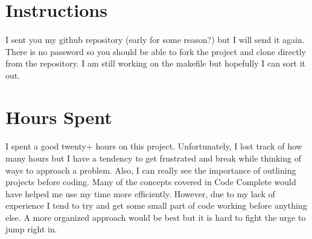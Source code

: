 \documentclass[11pt]{article}
\begin{document}
\section{Instructions}
\paragraph{} I sent you my github repository (early for some reason?) but I will send it again. There is no password so you should be able to fork the project and clone directly from the repository. I am still working on the makefile but hopefully I can sort it out.

\section{Hours Spent}
\paragraph{} I spent a good twenty+ hours on this project. Unfortunately, I lost track of how many hours but I have a tendency to get frustrated and break while thinking of ways to approach a problem. Also, I can really see the importance of outlining projects before coding. Many of the concepts covered in Code Complete would have helped me use my time more efficiently. However, due to my lack of experience I tend to try and get some small part of code working before anything else. A more organized approach would be best but it is hard to fight the urge to jump right in.
\end{document}
